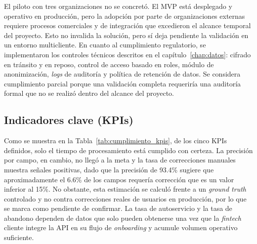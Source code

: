 El piloto con tres organizaciones no se concretó. El MVP está desplegado y operativo en producción, pero la adopción por parte de organizaciones externas requiere procesos comerciales y de integración que excedieron el alcance temporal del proyecto. Esto no invalida la solución, pero sí deja pendiente la validación en un entorno multicliente. En cuanto al cumplimiento regulatorio, se implementaron los controles técnicos descritos en el capítulo~\ref{chap:datos}: cifrado en tránsito y en reposo, control de acceso basado en roles, módulo de anonimización, \textit{logs} de auditoría y política de retención de datos. Se considera cumplimiento parcial porque una validación completa requeriría una auditoría formal que no se realizó dentro del alcance del proyecto.

\begin{table}[H]
\centering
{}
\caption{Evaluación de cumplimiento de los objetivos SMART}
\label{tab:cumplimiento_smart}
\end{table}

\subsection{Indicadores clave (KPIs)}

Como se muestra en la Tabla~\ref{tab:cumplimiento_kpis}, de los cinco KPIs definidos, solo el tiempo de procesamiento está cumplido con certeza. La precisión por campo, en cambio, no llegó a la meta y la tasa de correcciones manuales muestra señales positivas, dado que la precisión de 93.4\% sugiere que aproximadamente el 6.6\% de los campos requería corrección que es un valor inferior al 15\%. No obstante, esta estimación se calculó frente a un \textit{ground truth} controlado y no contra correcciones reales de usuarios en producción, por lo que se marca como pendiente de confirmar. La tasa de autoservicio y la tasa de abandono dependen de datos que solo pueden obtenerse una vez que la \textit{fintech} cliente integre la API en su flujo de \textit{onboarding} y acumule volumen operativo suficiente.

